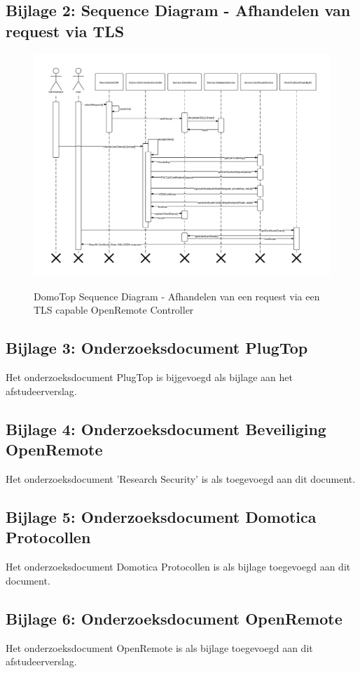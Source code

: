 \documentclass[]{article}
\begin{document}
\begin{landscape}
\subsection{Bijlage 2: Sequence Diagram - Afhandelen van request via TLS}
\begin{figure}[h!]
  \centering
    \includegraphics[height=0.80\textheight,keepaspectratio]{DomoTopSequenceDiagram_without_title.pdf}
  \label{fig:tls}
  \caption{DomoTop Sequence Diagram - Afhandelen van een request via een TLS
  capable OpenRemote Controller}
\end{figure}
\end{landscape}

\newpage
\subsection{Bijlage 3: Onderzoeksdocument PlugTop}
Het onderzoeksdocument PlugTop is bijgevoegd als bijlage aan het
afstudeerverslag.

\newpage
\subsection{Bijlage 4: Onderzoeksdocument Beveiliging OpenRemote}
Het onderzoeksdocument 'Research Security' is als toegevoegd aan dit document.

\newpage
\subsection{Bijlage 5: Onderzoeksdocument Domotica Protocollen}
Het onderzoeksdocument Domotica Protocollen is als bijlage toegevoegd aan dit
document.

\newpage
\subsection{Bijlage 6: Onderzoeksdocument OpenRemote}
Het onderzoeksdocument OpenRemote is als bijlage toegevoegd aan dit
afstudeerverslag.
\end{document}
